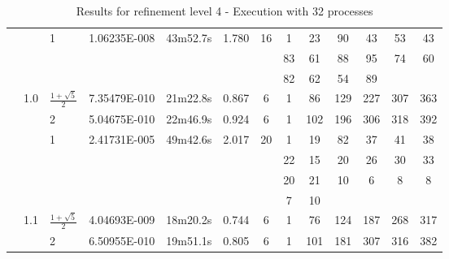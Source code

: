 \begin{sidewaystable}[p]
\begin{changemargin}{-2.8cm}{0cm}
\begin{tabular}{l c p{2cm} | c c c c c c c c c c}
 \hline
  & & 1 & 1.06235E-008 & 43m52.7s & 1.780 & 16 & 1 & 23 & 90 & 43 & 53 & 43 \\
  & & & & & & & 83 & 61 & 88 & 95 & 74 & 60 \\
  & & & & & & & 82 & 62 & 54 & 89 \\
& 1.0 & $ \frac{1 + \sqrt{5}}{2} $ &
7.35479E-010 & 21m22.8s & 0.867 & 6 & 1 & 86 & 129 & 227 & 307 & 363 \\
 & & 2 & 5.04675E-010 & 22m46.9s & 0.924 & 6 & 1 & 102 & 196 & 306 & 318 & 392 \\

 \hline
  & & 1 & 2.41731E-005 & 49m42.6s & 2.017 & 20 & 1 & 19 & 82 & 37 & 41 & 38 \\
  & & & & & & & 22 & 15 & 20 & 26 & 30 & 33 \\
  & & & & & & & 20 & 21 & 10 & 6 & 8 & 8 \\
  & & & & & & & 7 & 10 \\
& 1.1 & $ \frac{1 + \sqrt{5}}{2} $ &
4.04693E-009 & 18m20.2s & 0.744 & 6 & 1 & 76 & 124 & 187 & 268 & 317 \\
 & & 2 & 6.50955E-010 & 19m51.1s & 0.805 & 6 & 1 & 101 & 181 & 307 & 316 & 382 \\  \hline 
\end{tabular}

\caption{ Results for refinement level 4 - Execution with 32 processes }

\end{changemargin}

\end{sidewaystable}
